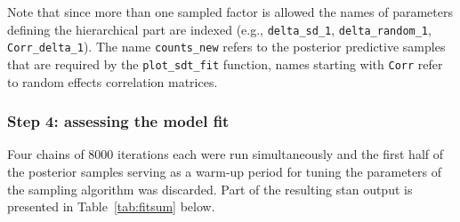 \documentclass[oneside,a4paper]{article}
\begin{document}
Note that since more than one sampled factor is allowed the names of
parameters defining the hierarchical part are indexed (e.g.,
\texttt{delta\_sd\_1}, \texttt{delta\_random\_1},
\texttt{Corr\_delta\_1}). The name \texttt{counts\_new} refers to the
posterior predictive samples that are required by the
\texttt{plot\_sdt\_fit} function, names starting with \texttt{Corr}
refer to random effects correlation matrices.

\subsubsection{Step 4: assessing the model fit}

Four chains of 8000 iterations each were run simultaneously and the
first half of the posterior samples serving as a warm-up period for
tuning the parameters of the sampling algorithm was discarded. Part of
the resulting stan output is presented in Table~\ref{tab:fitsum}
below.
\end{document}
